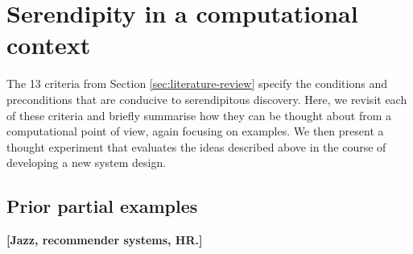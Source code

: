 \section{Serendipity in a computational context} \label{sec:computational-serendipity}

The 13 criteria from Section \ref{sec:literature-review} specify the
conditions and preconditions that are conducive to serendipitous
discovery.  Here, we revisit each of these criteria and briefly
summarise how they can be thought about from a computational point of
view, again focusing on examples.  We then present a thought
experiment that evaluates the ideas described above in the course of
developing a new system design.

% 

\subsection{Prior partial examples}

\textbf{[Jazz, recommender systems, HR.]}
